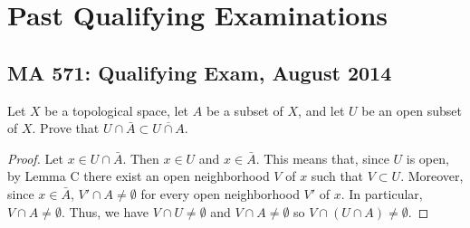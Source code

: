 \chapter{Past Qualifying Examinations}
\section{MA 571: Qualifying Exam, August 2014}
\begin{problem}
Let $X$ be a topological space, let $A$ be a subset of $X$, and let $U$ be
an open subset of $X$. Prove that $U\cap \bar A\subset\overline{U\cap A}$.
\end{problem}
\begin{proof}
Let $x\in U\cap\bar A$. Then $x\in U$ and $x\in\bar A$. This means that,
since $U$ is open, by Lemma C there exist an open neighborhood $V$ of $x$
such that $V\subset U$. Moreover, since $x\in\bar A$, $V'\cap
A\neq\emptyset$ for every open neighborhood $V'$ of $x$. In particular,
$V\cap A\neq\emptyset$. Thus, we have $V\cap U\neq\emptyset$ and $V\cap
A\neq\emptyset$ so $V\cap(U\cap A)\neq\emptyset$.
\end{proof}

